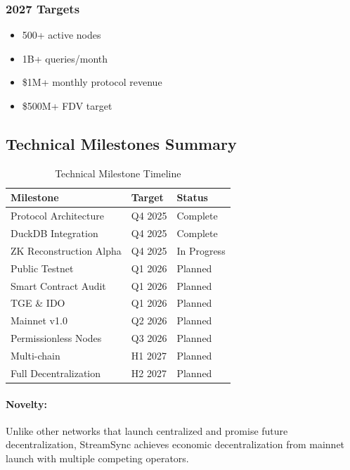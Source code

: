 \documentclass[12pt,a4paper]{article}
\begin{document}
\subsubsection{2027 Targets}
\begin{itemize}
    \item 500+ active nodes
    \item 1B+ queries/month
    \item \$1M+ monthly protocol revenue
    \item \$500M+ FDV target
\end{itemize}

\subsection{Technical Milestones Summary}

\begin{table}[h]
\centering
\small
\begin{tabular}{lll}
\toprule
\textbf{Milestone} & \textbf{Target} & \textbf{Status} \\
\midrule
Protocol Architecture & Q4 2025 & Complete \\
DuckDB Integration & Q4 2025 & Complete \\
ZK Reconstruction Alpha & Q4 2025 & In Progress \\
Public Testnet & Q1 2026 & Planned \\
Smart Contract Audit & Q1 2026 & Planned \\
TGE \& IDO & Q1 2026 & Planned \\
Mainnet v1.0 & Q2 2026 & Planned \\
Permissionless Nodes & Q3 2026 & Planned \\
Multi-chain & H1 2027 & Planned \\
Full Decentralization & H2 2027 & Planned \\
\bottomrule
\end{tabular}
\caption{Technical Milestone Timeline}
\end{table}

\paragraph{Novelty:} Unlike other networks that launch centralized and promise future decentralization, StreamSync achieves economic decentralization from mainnet launch with multiple competing operators.

\end{document}
